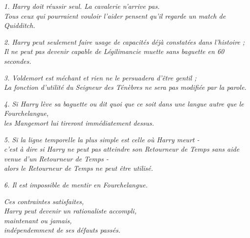 \begin{center}\emph{1. Harry doit réussir seul. La cavalerie n'arrive pas.} \\\emph{Tous ceux qui pourraient vouloir l'aider pensent qu'il regarde un match de Quidditch. } \end{center}



\begin{center}\emph{2. Harry peut seulement faire usage de capacités déjà constatées dans l'histoire ;} \\\emph{Il ne peut pas devenir capable de Légilimancie muette sans baguette en 60 secondes. } \end{center}



\begin{center}\emph{3. Voldemort est méchant et rien ne le persuadera d'être gentil ;} \\\emph{La fonction d'utilité du Seigneur des Ténèbres ne sera pas modifiée par la parole. } \end{center}



\begin{center}\emph{4. Si Harry lève sa baguette ou dit quoi que ce soit dans une langue autre que le Fourchelangue,} \\\emph{les Mangemort lui tireront immédiatement dessus. } \end{center}



\begin{center}\emph{5. Si la ligne temporelle la plus simple est celle où Harry meurt -} \\\emph{c'est à dire si Harry ne peut pas atteindre son Retourneur de Temps sans aide venue d'un Retourneur de Temps -} \\\emph{alors le Retourneur de Temps ne peut être utilisé. } \end{center}



\begin{center}\emph{6. Il est impossible de mentir en Fourchelangue. } \end{center}



\begin{center}\emph{Ces contraintes satisfaites,} \\\emph{Harry peut devenir un rationaliste accompli,} \\\emph{maintenant ou jamais,} \\\emph{indépendemment de ses défauts passés. } \end{center}



